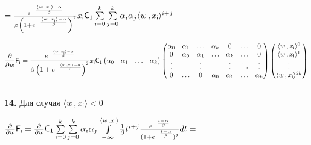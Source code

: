 \documentclass[a4paper,12pt]{article}
\begin{document}
\begin{center}
    $= {e^{-{\langle w \,, x_{\mathsf{i}}\rangle - \alpha\over{\beta}}}\over{\beta\left(1 + e^{-{\langle w \,, x_{\mathsf{i}}\rangle - \alpha\over{\beta}}}\right)^2}} x_{\mathsf{i}} \mathsf{C_1} \sum\limits_{i = 0}^k \sum\limits_{j = 0}^k \alpha_i \alpha_j \langle w \,, x_{\mathsf{i}}\rangle^{i + j}$
\end{center}

\begin{displaymath}
    {\partial\over{\partial w}} \mathsf{F_i} = {e^{-{\langle w \,, x_{\mathsf{i}}\rangle - \alpha\over{\beta}}}\over{\beta\left(1 + e^{-{\langle w \,, x_{\mathsf{i}}\rangle - \alpha\over{\beta}}}\right)^2}} x_{\mathsf{i}} \mathsf{C_1} \begin{pmatrix}
        \alpha_0 & \alpha_1 & \ldots & \alpha_k \\
    \end{pmatrix} \begin{pmatrix}
        \alpha_0 & \alpha_1 & \ldots & \alpha_k & 0 & \ldots & 0 \\
        0 & \alpha_0 & \alpha_1 & \ldots & \alpha_k & \ldots & 0 \\
        \vdots &  & \vdots &  & \vdots & \ddots & \vdots\\
        0 & \ldots & 0 & \alpha_0 & \alpha_1 &\ldots & \alpha_k \\
    \end{pmatrix} \begin{pmatrix}
        \langle w \,, x_{\mathsf{i}}\rangle^{0} \\ \langle w \,, x_{\mathsf{i}}\rangle^{1} \\ \vdots \\ \langle w \,, x_{\mathsf{i}}\rangle^{\mathsf{2}k} \\
    \end{pmatrix}
\end{displaymath}\\

\noindent\textbf{14.} Для случая $\langle w \,, x_{\mathsf{i}}\rangle < 0$

\begin{center}
    ${\partial\over{\partial w}} \mathsf{F_i} = {\partial\over{\partial w}} \mathsf{C_1} \sum\limits_{i = 0}^k \sum\limits_{j = 0}^k \alpha_i \alpha_j \int\limits_{-\infty}^{\langle w \,, x_{\mathsf{i}}\rangle} {1\over{\beta}} t^{i + j} {e^{-{t - \alpha\over{\beta}}}\over{(1 + e^{-{t - \alpha\over{\beta}}}})^2} d t = $
\end{center}
\end{document}
